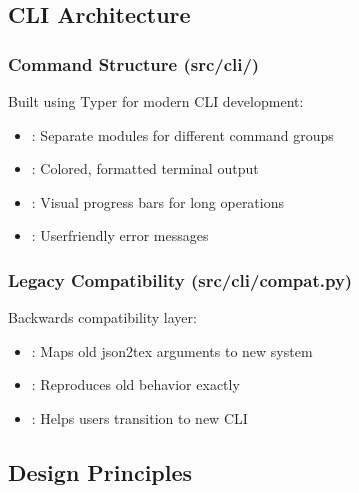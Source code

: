 \documentclass[letterpaper,10pt,english]{sphinxmanual}
\begin{document}
\subsection{CLI Architecture}
\label{\detokenize{developer/architecture:cli-architecture}}

\subsubsection{Command Structure (src/cli/)}
\label{\detokenize{developer/architecture:command-structure-src-cli}}
\sphinxAtStartPar
Built using Typer for modern CLI development:
\begin{itemize}
\item {} 
\sphinxAtStartPar
{}: Separate modules for different command groups

\item {} 
\sphinxAtStartPar
{}: Colored, formatted terminal output

\item {} 
\sphinxAtStartPar
{}: Visual progress bars for long operations

\item {} 
\sphinxAtStartPar
{}: User\sphinxhyphen{}friendly error messages

\end{itemize}


\subsubsection{Legacy Compatibility (src/cli/compat.py)}
\label{\detokenize{developer/architecture:legacy-compatibility-src-cli-compat-py}}
\sphinxAtStartPar
Backwards compatibility layer:
\begin{itemize}
\item {} 
\sphinxAtStartPar
{}: Maps old json2tex arguments to new system

\item {} 
\sphinxAtStartPar
{}: Reproduces old behavior exactly

\item {} 
\sphinxAtStartPar
{}: Helps users transition to new CLI

\end{itemize}


\subsection{Design Principles}
\label{\detokenize{developer/architecture:design-principles}}
\end{document}
